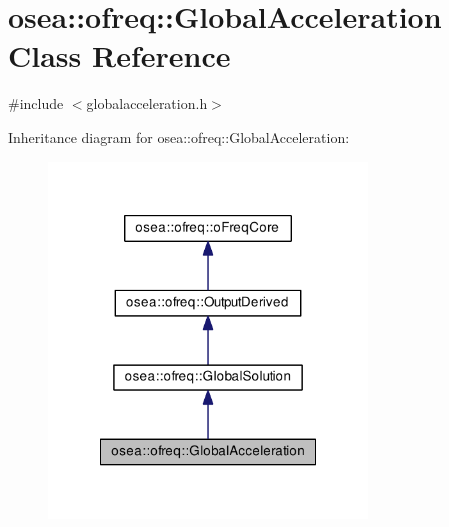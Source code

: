 \hypertarget{classosea_1_1ofreq_1_1_global_acceleration}{\section{osea\-:\-:ofreq\-:\-:Global\-Acceleration Class Reference}
\label{classosea_1_1ofreq_1_1_global_acceleration}
}


{\ttfamily \#include $<$globalacceleration.\-h$>$}



Inheritance diagram for osea\-:\-:ofreq\-:\-:Global\-Acceleration\-:\nopagebreak
\begin{figure}[H]
\begin{center}
\leavevmode
\includegraphics[width=240pt]{classosea_1_1ofreq_1_1_global_acceleration__inherit__graph}
\end{center}
\end{figure}


